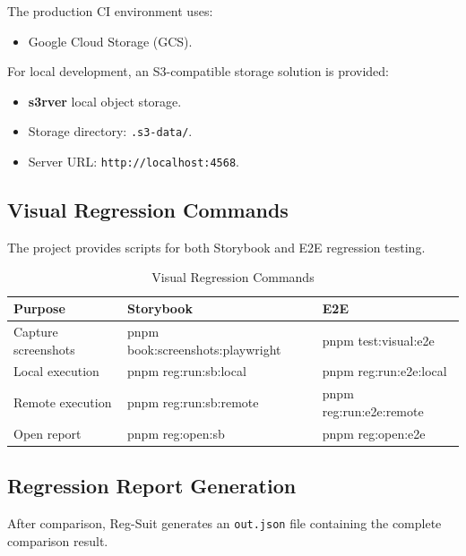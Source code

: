 The production CI environment uses:

\begin{itemize}
    \item Google Cloud Storage (GCS).
\end{itemize}

For local development, an S3-compatible storage solution is provided:

\begin{itemize}
    \item \textbf{s3rver} local object storage.
    \item Storage directory: \texttt{.s3-data/}.
    \item Server URL: \texttt{http://localhost:4568}.
\end{itemize}


\subsection{Visual Regression Commands}

The project provides scripts for both Storybook and E2E regression testing.

\begin{table}[H]
\centering
\caption{Visual Regression Commands}
\begin{tabular}{|p{5cm}|p{4cm}|p{4cm}|}
\hline
\textbf{Purpose} & \textbf{Storybook} & \textbf{E2E} \\
\hline
Capture screenshots &
pnpm book:screenshots:playwright &
pnpm test:visual:e2e
\\
\hline

Local execution &
pnpm reg:run:sb:local &
pnpm reg:run:e2e:local
\\
\hline

Remote execution &
pnpm reg:run:sb:remote &
pnpm reg:run:e2e:remote
\\
\hline

Open report &
pnpm reg:open:sb &
pnpm reg:open:e2e
\\
\hline
\end{tabular}
\end{table}


\subsection{Regression Report Generation}

After comparison, Reg-Suit generates an \texttt{out.json} file containing the complete comparison result.


